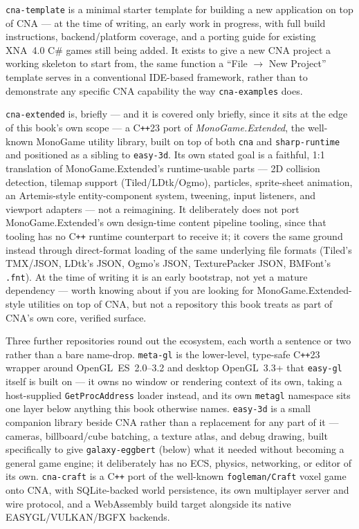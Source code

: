 \texttt{cna-template} is a minimal starter template for building a new application on top of
CNA --- at the time of writing, an early work in progress, with full build instructions,
backend/platform coverage, and a porting guide for existing XNA~4.0 C\# games still being
added. It exists to give a new CNA project a working skeleton to start from, the same
function a ``File $\to$ New Project'' template serves in a conventional IDE-based framework,
rather than to demonstrate any specific CNA capability the way \texttt{cna-examples} does.

\texttt{cna-extended} is, briefly --- and it is covered only briefly, since it sits at the
edge of this book's own scope --- a C\texttt{++}23 port of \emph{MonoGame.Extended}, the
well-known MonoGame utility library, built on top of both \texttt{cna} and
\texttt{sharp-runtime} and positioned as a sibling to \texttt{easy-3d}. Its own stated goal is
a faithful, 1:1 translation of MonoGame.Extended's runtime-usable parts --- 2D collision
detection, tilemap support (Tiled/LDtk/Ogmo), particles, sprite-sheet animation, an
Artemis-style entity-component system, tweening, input listeners, and viewport adapters ---
not a reimagining. It deliberately does not port MonoGame.Extended's own design-time content
pipeline tooling, since that tooling has no C\texttt{++} runtime counterpart to receive it; it
covers the same ground instead through direct-format loading of the same underlying file
formats (Tiled's TMX/JSON, LDtk's JSON, Ogmo's JSON, TexturePacker JSON, BMFont's
\texttt{.fnt}). At the time of writing it is an early bootstrap, not yet a mature dependency
--- worth knowing about if you are looking for MonoGame.Extended-style utilities on top of
CNA, but not a repository this book treats as part of CNA's own core, verified surface.

Three further repositories round out the ecosystem, each worth a sentence or two rather than a
bare name-drop. \texttt{meta-gl} is the lower-level, type-safe C\texttt{++}23 wrapper around
OpenGL~ES~2.0--3.2 and desktop OpenGL~3.3+ that \texttt{easy-gl} itself is built on --- it owns
no window or rendering context of its own, taking a host-supplied \texttt{GetProcAddress}
loader instead, and its own \texttt{metagl} namespace sits one layer below anything this book
otherwise names. \texttt{easy-3d} is a small companion library beside CNA rather than a
replacement for any part of it --- cameras, billboard/cube batching, a texture atlas, and debug
drawing, built specifically to give \texttt{galaxy-eggbert} (below) what it needed without
becoming a general game engine; it deliberately has no ECS, physics, networking, or editor of
its own. \texttt{cna-craft} is a C\texttt{++} port of the well-known \texttt{fogleman/Craft}
voxel game onto CNA, with SQLite-backed world persistence, its own multiplayer server and wire
protocol, and a WebAssembly build target alongside its native EASYGL/VULKAN/BGFX backends.

